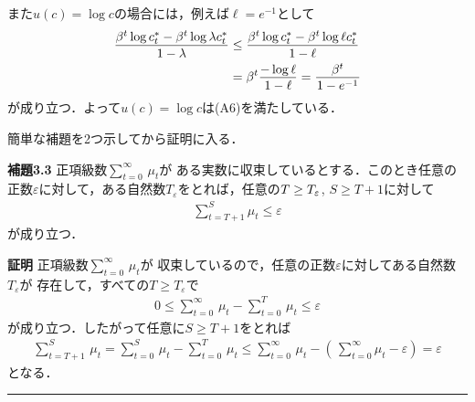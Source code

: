 \documentclass[a4paper,11pt]{jsarticle}
\DeclareRobustCommand{\lfrac}[2]{{\lower.4ex\hbox{\begingroup\ensuremath{#1}\endgroup}\over{\hspace{.2mm}#2\hspace{.2mm}}}}
\begin{document}
また$u(c)=\log c$の場合には，例えば$\ell=e^{-1}$として
\jot=6pt
\begin{align*}
	\lfrac{\beta^t \log c_t^*-\beta^t \log \lambda c_t^*}{1-\lambda}
	&\leq \lfrac{\beta^t \log c_t^*-\beta^t \log \ell c_t^*}{1-\ell}\\
	&=\beta^t \lfrac{-\log \ell}{1-\ell}=\lfrac{\beta^t}{1-e^{-1}}
\end{align*}
\jot=3pt
が成り立つ．よって$u(c)=\log c$は(A6)を満たしている．

\bigskip

簡単な補題を2つ示してから証明に入る．

\vspace{7mm}
\noindent \textbf{補題3.3}\hspace*{.7mm} 正項級数${\textstyle \sum_{t=0}^\infty}\, \mu_t$が
ある実数に収束しているとする．このとき任意の正数$\varepsilon$に対して，ある自然数$T_\varepsilon$をとれば，任意の$T \geq T_\varepsilon\hspace*{.2mm}$, $S\geq T+1$に対して
\begin{align*}
	\sum_{t=T+1}^S \mu_t \leq \varepsilon
\end{align*}
が成り立つ．
\bigskip

\noindent \textbf{証明}\hspace{.7mm} 正項級数${\textstyle \sum_{t=0}^\infty}\, \mu_t$が
収束しているので，任意の正数$\varepsilon$に対してある自然数$T_\varepsilon$が
存在して，すべての$T \geq T_\varepsilon$で
\begin{align*}
	0\leq \sum_{t=0}^\infty \, \mu_t -\sum_{t=0}^T \, \mu_t\leq \varepsilon
\end{align*}
が成り立つ．したがって任意に$S \geq T+1$をとれば
\begin{align*}
	\sum_{t=T+1}^S\, \mu_t=\sum_{t=0}^S \, \mu_t-\sum_{t=0}^T \, \mu_t\leq \sum_{t=0}^\infty \, \mu_t-\left(\, \sum_{t=0}^\infty \mu_t -\varepsilon \right)=\varepsilon
\end{align*}
となる．\hfill \rule[-2pt]{5pt}{10pt}
\end{document}
